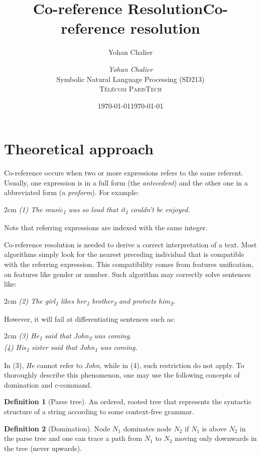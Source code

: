\documentclass[a4paper]{article}
\title{Co-reference Resolution}
\author{Yohan Chalier}
\date{\today}
\title{Co-reference resolution}
\date{\today}
\author{\textit{Yohan Chalier}\\ Symbolic Natural Language Processing (SD213) \\ \textsc{Télécom ParisTech}}
\theoremstyle{definition}
\newtheorem{definition}{Definition}[section]
\newcommand{\sub}[1]{\textsubscript{#1}}
\newenvironment{sentence}{\vspace{.1cm}\begin{adjustwidth}{2cm}{}\em}{\end{adjustwidth}\vspace{.1cm}}
\begin{document}
\maketitle

\section{Theoretical approach}

Co-reference occurs when two or more expressions refers to the same referent. Usually, one expression is in a full form (the \emph{antecedent}) and the other one in a abbreviated form (a \emph{proform}). For example:
\begin{sentence}
(1) The music\sub{1} was so loud that it\sub{1} couldn't be enjoyed.
\end{sentence}
Note that referring expressions are indexed with the same integer.

Co-reference resolution is needed to derive a correct interpretation of a text. Most algorithms simply look for the nearest preceding individual that is compatible with the referring expression. This compatibility comes from features unification, on features like gender or number. Such algorithm may correctly solve sentences like:
\begin{sentence}
(2) The girl\sub{1} likes her\sub{1} brother\sub{2} and protects him\sub{2}.
\end{sentence}
However, it will fail at differentiating sentences such as:
\begin{sentence}
(3) He\sub{1} said that John\sub{2} was coming. \\
(4) His\sub{1} sister said that John\sub{1} was coming.
\end{sentence}
In (3), \emph{He} cannot refer to \emph{John}, while in (4), such restriction do not apply. To thoroughly describe this phenomenon, one may use the following concepts of domination and c-command.

\begin{definition}[Parse tree]
An ordered, rooted tree that represents the syntactic structure of a string according to some context-free grammar.
\end{definition}

\begin{definition}[Domination]
Node $N_1$ dominates node $N_2$ if $N_1$ is above $N_2$ in the parse tree and one can trace a path from $N_1$ to $N_2$ moving only downwards in the tree (never upwards).
\end{definition}
\end{document}
